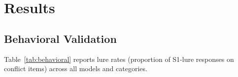 \documentclass{article}
\begin{document}

\section{Results}
\label{sec:results}

\subsection{Behavioral Validation}
\label{sec:results_behavioral}

Table~\ref{tab:behavioral} reports lure rates (proportion of S1-lure
responses on conflict items) across all models and categories.
\end{document}
